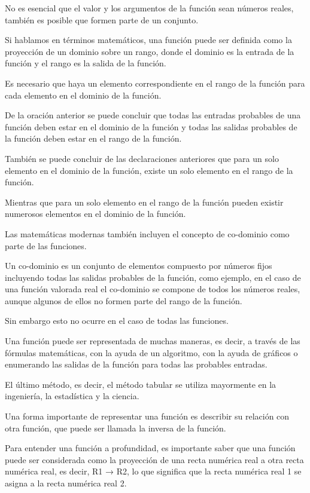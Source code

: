 \documentclass[oneside,spanish,letterpaper]{extbook}
\theoremstyle{mythmstyle}
\begin{document}
No es esencial que el valor y los argumentos de la función sean números reales,
también es posible que formen parte de un conjunto.

Si hablamos en términos matemáticos, una función puede ser definida como la proyección de un
dominio sobre un rango, donde el dominio es la entrada de la función y el rango es la salida de la función.

Es necesario que haya un elemento correspondiente en el rango de la función para cada elemento
en el dominio de la función.

De la oración anterior se puede concluir que todas las entradas probables de una función deben
estar en el dominio de la función y todas las salidas probables de la función deben estar en el rango de la función.

También se puede concluir de las declaraciones anteriores que para un solo elemento en el dominio
de la función, existe un solo elemento en el rango de la función.

Mientras que para un solo elemento en el rango de la función pueden existir numerosos elementos
en el dominio de la función.

Las matemáticas modernas también incluyen el concepto de co-dominio como parte de las funciones.

Un co-dominio es un conjunto de elementos compuesto por números fijos incluyendo todas las salidas
probables de la función, como ejemplo, en el caso de una función valorada real el co-dominio se
compone de todos los números reales, aunque algunos de ellos no formen parte del rango de la función.

Sin embargo esto no ocurre en el caso de todas las funciones.

Una función puede ser representada de muchas maneras, es decir, a través de las fórmulas matemáticas, 
con la ayuda de un algoritmo, con la ayuda de gráficos o enumerando las salidas de la función para todas las
probables entradas.

El último método, es decir, el método tabular se utiliza mayormente en la ingeniería,
la estadística y la ciencia.

Una forma importante de representar una función es describir su relación con otra función,
que puede ser llamada la inversa de la función.

Para entender una función a profundidad, es importante saber que una función puede ser considerada
como la proyección de una recta numérica real a otra recta numérica real, es decir, R1 → R2, lo que
significa que la recta numérica real 1 se asigna a la recta numérica real 2.
\end{document}
